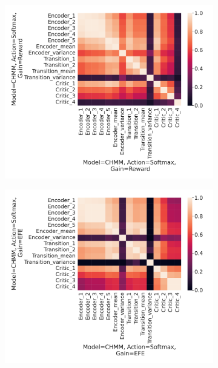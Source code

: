 \documentclass[twoside,11pt]{article}
\begin{document}
\begin{figure}[ht!]
    \centering
    \begin{subfigure}{.3\textwidth}
        \centering
        \includegraphics[draft=false,width=\linewidth]{cka_figures/CKA_chmm_109_chmm_109}
        \caption{}\label{sfig:cka-chmm-chmm-sm}
    \end{subfigure}%
    \begin{subfigure}{.3\textwidth}
        \centering
        \includegraphics[draft=false,width=\linewidth]{cka_figures/CKA_chmm_113_chmm_113}

\end{subfigure}
\end{figure}
\end{document}
